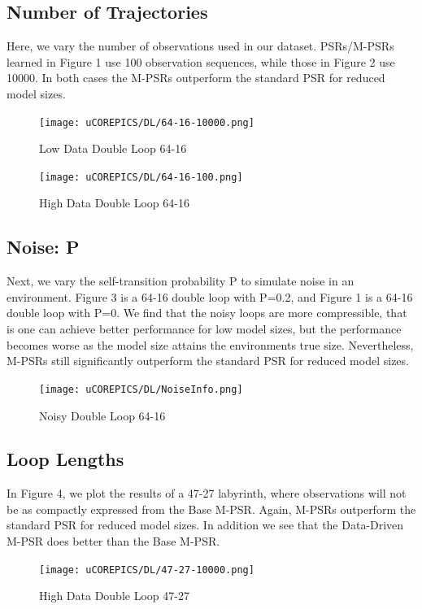 \subsection{Number of Trajectories}

Here, we vary the number of observations used in our dataset. PSRs/M-PSRs learned in Figure 1 use 100 observation sequences, while those in Figure 2 use 10000. In both cases the M-PSRs outperform the standard PSR for reduced model sizes.

\begin{figure}[ht!]
\centering
\texttt{[image: uCOREPICS/DL/64-16-10000.png]}
\caption{Low Data Double Loop 64-16\label{overflow}}
\end{figure}

\begin{figure}[ht!]
\centering
\texttt{[image: uCOREPICS/DL/64-16-100.png]}
\caption{High Data Double Loop 64-16\label{overflow}}
\end{figure}

\subsection{Noise: P}

Next, we vary the self-transition probability P to simulate noise in an environment. Figure 3 is a 64-16 double loop with P=0.2, and Figure 1 is a 64-16 double loop with P=0. We find that the noisy loops are more compressible, that is one can achieve better performance for low model sizes, but the performance becomes worse as the model size attains the environments true size. Nevertheless, M-PSRs still significantly outperform the standard PSR for reduced model sizes.

\begin{figure}[ht!]
\centering
\texttt{[image: uCOREPICS/DL/NoiseInfo.png]}
\caption{Noisy Double Loop 64-16\label{overflow}}
\end{figure}

\subsection{Loop Lengths}

In Figure 4, we plot the results of a 47-27 labyrinth, where observations will not be as compactly expressed from the Base M-PSR. Again, M-PSRs outperform the standard PSR for reduced model sizes. In addition we see that the Data-Driven M-PSR does better than the Base M-PSR.

\begin{figure}[ht!]
\centering
\texttt{[image: uCOREPICS/DL/47-27-10000.png]}
\caption{High Data Double Loop 47-27\label{overflow}}
\end{figure}

